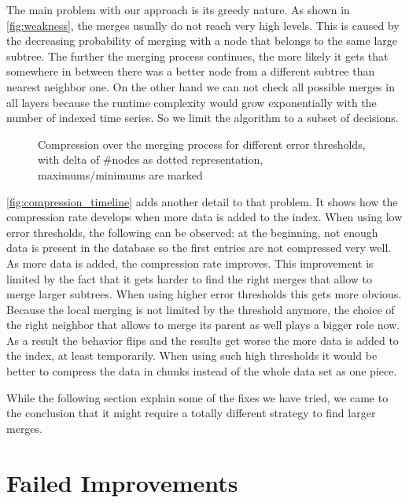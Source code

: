 The main problem with our approach is its greedy nature. As shown in \autoref{fig:weakness}, the merges usually do not reach very high levels. This is caused by the decreasing probability of merging with a node that belongs to the same large subtree. The further the merging process continues, the more likely it gets that somewhere in between there was a better node from a different subtree than nearest neighbor one. On the other hand we can not check all possible merges in all layers because the runtime complexity would grow exponentially with the number of indexed time series. So we limit the algorithm to a subset of decisions.

\begin{figure}
    \centering
    
    \caption[Compression over the merging process]{Compression over the merging process for different error thresholds, with delta of \#nodes as dotted representation, maximums/minimums are marked}\label{fig:compression_timeline}
\end{figure}

\autoref{fig:compression_timeline} adds another detail to that problem. It shows how the compression rate develops when more data is added to the index. When using low error thresholds, the following can be observed: at the beginning, not enough data is present in the database so the first entries are not compressed very well. As more data is added, the compression rate improves. This improvement is limited by the fact that it gets harder to find the right merges that allow to merge larger subtrees. When using higher error thresholds this gets more obvious. Because the local merging is not limited by the threshold anymore, the choice of the right neighbor that allows to merge its parent as well plays a bigger role now. As a result the behavior flips and the results get worse the more data is added to the index, at least temporarily. When using such high thresholds it would be better to compress the data in chunks instead of the whole data set as one piece.

While the following section explain some of the fixes we have tried, we came to the conclusion that it might require a totally different strategy to find larger merges.



\section{Failed Improvements}
\label{sec:algorithm:fail}

